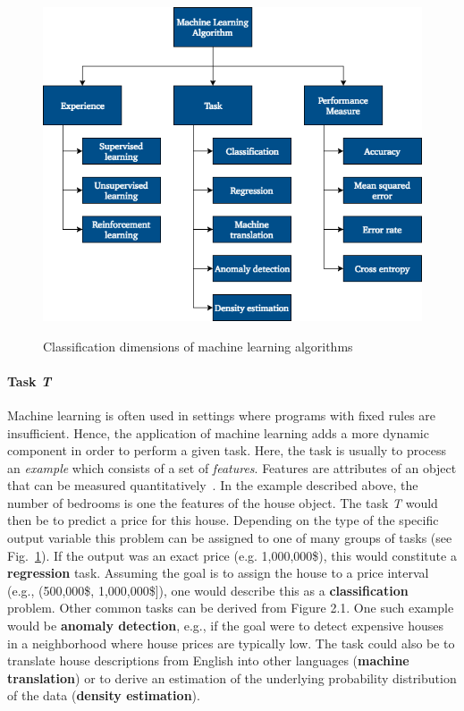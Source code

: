 \begin{figure}[h]
  \centering
  \includegraphics[height=10cm]{img/ml_classification}
  \caption{Classification dimensions of machine learning algorithms}
\label{fig:ml_classification}
\end{figure}

\paragraph{Task \textit{T}}

Machine learning is often used in settings where programs with fixed rules are
insufficient. Hence, the application of machine learning adds a more dynamic
component in order to perform a given task. Here, the task is usually to process
an \textit{example} which consists of a set of \textit{features}. Features are
attributes of an object that can be measured quantitatively~\cite{Goodfellow2016}. 
In the example described above, the number of bedrooms is one the features of 
the house object. The task \textit{T} would then be to predict a price for this 
house. Depending on the type of the specific output variable this problem can 
be assigned to one of many groups of tasks (see Fig.~\ref{fig:ml_classification}). If the output was an
exact price (e.g. 1,000,000\$), this would constitute a \textbf{regression} task. 
Assuming the goal is to assign the house to a price interval (e.g., (500,000\$, 1,000,000\$]),
one would describe this as a \textbf{classification} problem. Other common tasks
can be derived from Figure 2.1. One such example would be \textbf{anomaly detection}, e.g.,
if the goal were to detect expensive houses in a neighborhood where house prices
are typically low. The task could also be to translate house descriptions from
English into other languages (\textbf{machine translation}) or to derive an
estimation of the underlying probability distribution of the data (\textbf{density estimation}).

